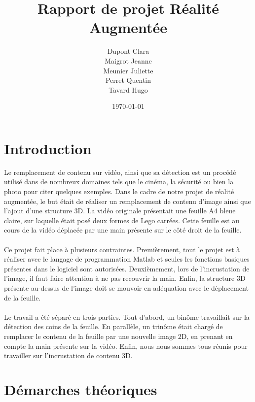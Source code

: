 \documentclass[blue]{ceri/sty/rapport}
\title{Rapport de projet Réalité Augmentée}
\author{
	Dupont Clara \\ %
	Maigrot Jeanne \\
	Meunier Juliette \\
	Perret Quentin \\
    Tavard Hugo
}
\date{\today}
\begin{document}
 

\maketitle

\sloppy      


\section{Introduction}
\label{sec:Introduction}

Le remplacement de contenu sur vidéo, ainsi que sa détection est un procédé utilisé dans de nombreux domaines tels que le cinéma, la sécurité ou bien la photo pour citer quelques exemples. 
Dans le cadre de notre projet de réalité augmentée, le but était de réaliser un remplacement de contenu d’image ainsi que l’ajout d’une structure 3D. La vidéo originale présentait une feuille A4 bleue claire, sur laquelle était posé deux formes de Lego carrées. Cette feuille est au cours de la vidéo déplacée par une main présente sur le côté droit de la feuille. \\
\\
Ce projet fait place à plusieurs contraintes. Premièrement, tout le projet est à réaliser avec le langage de programmation Matlab et seules les fonctions basiques présentes dans le logiciel sont autorisées. Deuxièmement, lors de l’incrustation de l’image, il faut faire attention à ne pas recouvrir la main. Enfin, la structure 3D présente au-dessus de l’image doit se mouvoir en adéquation avec le déplacement de la feuille.\\
\\
Le travail a été séparé en trois parties. Tout d’abord, un binôme travaillait sur la détection des coins de la feuille. En parallèle, un trinôme était chargé de remplacer le contenu de la feuille par une nouvelle image 2D, en prenant en compte la main présente sur la vidéo. Enfin, nous nous sommes tous réunis pour travailler sur l’incrustation de contenu 3D.



\section{Démarches théoriques}
\label{sec:Generalites1}
\end{document}
